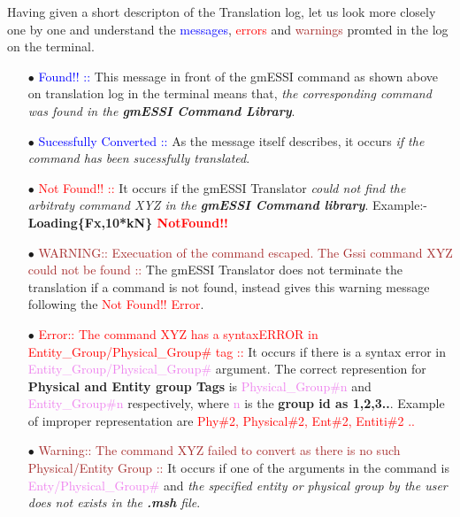 \documentclass[11pt]{article}
\begin{document}
Having given a short descripton of the Translation log, let us look more
closely one by one and understand the \textcolor{blue}{messages},
\textcolor{red}{errors} and \textcolor{brown}{warnings} promted in the log on
the terminal.

\begin{itemize}

  \item[$\bullet$] \textcolor{blue}{Found!! ::} 
  This message in front of the
  gmESSI  command  as  shown  above on translation log in the terminal means
  that,  \textit{the  corresponding  command was found in the \textbf{gmESSI
  Command Library}}.
  
  \item[$\bullet$]   \textcolor{blue}{  Sucessfully  Converted  ::}  
  As  the
  message  itself  describes,  it  occurs  \textit{if  the  command has been
  sucessfully translated}.
  
  \item[$\bullet$]  \textcolor{red}{Not  Found!! ::} 
  It occurs if the gmESSI
  Translator  \textit{could  not  find  the  arbitraty  command  XYZ  in the
  \textbf{gmESSI  Command  library}}.  Example:- \textbf{Loading\{Fx,10*kN\}
  \textcolor{red}{NotFound!!}}
  
  \item[$\bullet$]  \textcolor{brown}{WARNING::  Execuation  of  the command
  escaped. The Gssi command XYZ could not be found ::} 
  The gmESSI Translator
  does  not  terminate  the  translation  if a command is not found, instead
  gives  this  warning  message  following  the  \textcolor{red}{Not Found!!
  Error}.
  
  \item[$\bullet$] \textcolor{red}{Error:: The command XYZ has a syntaxERROR
  in  Entity\_Group/Physical\_Group\# tag ::} 
  It occurs if there is a syntax error in
  \textcolor{violet}{Entity\_Group/Physical\_Group\#}     argument.    The    correct
  represention    for   \textbf{Physical   and   Entity   group   Tags}   is
  \textcolor{violet}{Physical\_Group\#n}                                 and
  \textcolor{violet}{Entity\_Group\#n}          respectively,          where
  \textcolor{violet}{n}  is  the  \textbf{group  id  as 1,2,3..}. Example of
  improper     representation     are    \textcolor{red}{Phy\#2,
  Physical\#2, Ent\#2, Entiti\#2 ..}
  
  \item[$\bullet$]  \textcolor{brown}{Warning::  The  command  XYZ failed to
  convert  as there is no such Physical/Entity Group ::} 
  It occurs if one of
  the arguments in the command is \textcolor{violet}{Enty/Physical\_Group\#}
  and  \textit{the  specified  entity or physical group by the user does not
  exists in the \textbf{.msh} file}.
  

\end{itemize}
\end{document}
